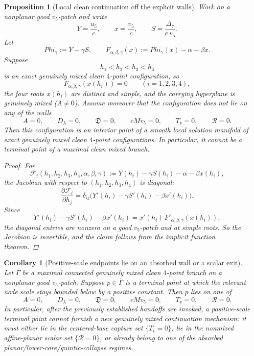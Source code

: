 \documentclass[11pt,a4paper]{amsart}
\def\Phi{Phi}%
\theoremstyle{plain}
\newtheorem{proposition}[theorem]{Proposition}
\newtheorem{corollary}[theorem]{Corollary}
\theoremstyle{definition}
\begin{document}
\begin{proposition}[Local clean continuation off the explicit walls]
\label{prop:local-clean-continuation-off-explicit-walls}
Work on a nonplanar good $v_5$-patch and write
\[
Y=\frac{u_5}{c},\qquad x=\frac{v_5}{c},\qquad S=\frac{\Delta_7}{c\,v_5}.
\]
Let
\[
\Phi_\gamma:=Y-\gamma S,
\qquad
F_{\alpha,\beta,\gamma}(x):=\Phi_\gamma(x)-\alpha-\beta x.
\]
Suppose
\[
h_1<h_2<h_3<h_4
\]
is an exact genuinely mixed clean $4$-point configuration, so
\[
F_{\alpha,\beta,\gamma}(x(h_i))=0
\qquad (i=1,2,3,4),
\]
the four roots $x(h_i)$ are distinct and simple, and the carrying hyperplane is
genuinely mixed ($A\neq 0$). Assume moreover that the configuration does not
lie on any of the walls
\[
A=0,\qquad D_\lambda=0,\qquad \mathfrak D=0,\qquad cMv_5=0,\qquad
T_v=0,\qquad \mathcal R=0.
\]
Then this configuration is an interior point of a smooth local solution
manifold of exact genuinely mixed clean $4$-point configurations. In
particular, it cannot be a terminal point of a maximal clean mixed branch.

\begin{proof}
For
\[
\mathcal F_i(h_1,h_2,h_3,h_4,\alpha,\beta,\gamma)
:=
Y(h_i)-\gamma S(h_i)-\alpha-\beta x(h_i),
\]
the Jacobian with respect to $(h_1,h_2,h_3,h_4)$ is diagonal:
\[
\frac{\partial \mathcal F_i}{\partial h_j}
=
\delta_{ij}\bigl(Y'(h_i)-\gamma S'(h_i)-\beta x'(h_i)\bigr).
\]
Since
\[
Y'(h_i)-\gamma S'(h_i)-\beta x'(h_i)
=
x'(h_i)\,F'_{\alpha,\beta,\gamma}(x(h_i)),
\]
the diagonal entries are nonzero on a good $v_5$-patch and at simple roots.
So the Jacobian is invertible, and the claim follows from the implicit
function theorem.
\end{proof}
\end{proposition}

\begin{corollary}[Positive-scale endpoints lie on an absorbed wall or a scalar exit]
\label{cor:positive-scale-endpoint-absorbed-or-scalar}
Let $\Gamma$ be a maximal connected genuinely mixed clean $4$-point branch on a
nonplanar good $v_5$-patch. Suppose $p\in\overline{\Gamma}$ is a terminal point
at which the relevant node scale stays bounded below by a positive constant.
Then $p$ lies on one of
\[
A=0,\qquad D_\lambda=0,\qquad \mathfrak D=0,\qquad cMv_5=0,\qquad
T_v=0,\qquad \mathcal R=0.
\]
In particular, after the previously established handoffs are invoked, a
positive-scale terminal point cannot furnish a new genuinely mixed continuation
mechanism: it must either lie in the centered-base capture set $\{T_v=0\}$,
lie in the nonmixed affine-planar scalar set $\{\mathcal R=0\}$, or already
belong to one of the absorbed planar/lower-core/quintic-collapse regimes.
\end{corollary}
\end{document}
